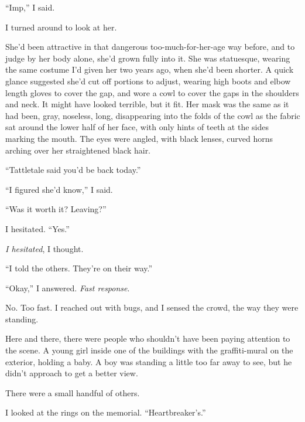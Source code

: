 ``Imp,'' I said.



I turned around to look at her.



She'd been attractive in that dangerous too-much-for-her-age way before, and to judge by her body alone, she'd grown fully into it.  She was statuesque, wearing the same costume I'd given her two years ago, when she'd been shorter.  A quick glance suggested she'd cut off portions to adjust, wearing high boots and elbow length gloves to cover the gap, and wore a cowl to cover the gaps in the shoulders and neck.  It might have looked terrible, but it fit.  Her mask was the same as it had been, gray, noseless, long, disappearing into the folds of the cowl as the fabric sat around the lower half of her face, with only hints of teeth at the sides marking the mouth.  The eyes were angled, with black lenses, curved horns arching over her straightened black hair.



``Tattletale said you'd be back today.''



``I figured she'd know,'' I said.



``Was it worth it?  Leaving?''



I hesitated.  ``Yes.''



\emph{I hesitated}, I thought.



``I told the others.  They're on their way.''



``Okay,'' I answered.  \emph{Fast response}.



No.  Too fast.  I reached out with bugs, and I sensed the crowd, the way they were standing.



Here and there, there were people who shouldn't have been paying attention to the scene.  A young girl inside one of the buildings with the graffiti-mural on the exterior, holding a baby.  A boy was standing a little too far away to see, but he didn't approach to get a better view.



There were a small handful of others.



I looked at the rings on the memorial.  ``Heartbreaker's.''




